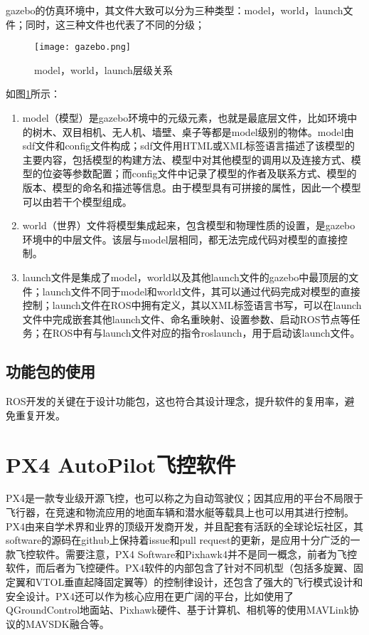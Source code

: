 gazebo的仿真环境中，其文件大致可以分为三种类型：model，world，launch文件；同时，这三种文件也代表了不同的分级；

\begin{figure}[!ht]
	\centering
	\texttt{[image: gazebo.png]}
	\caption{model，world，launch层级关系} 
	\label{fig3}
\end{figure}

如图\ref{fig3}所示：
\begin{enumerate}
	\item model（模型）是gazebo环境中的元级元素，也就是最底层文件，比如环境中的树木、双目相机、无人机、墙壁、桌子等都是model级别的物体。model由sdf文件和config文件构成；sdf文件用HTML或XML标签语言描述了该模型的主要内容，包括模型的构建方法、模型中对其他模型的调用以及连接方式、模型的位姿等参数配置；而config文件中记录了模型的作者及联系方式、模型的版本、模型的命名和描述等信息。由于模型具有可拼接的属性，因此一个模型可以由若干个模型组成。
	\item
	world（世界）文件将模型集成起来，包含模型和物理性质的设置，是gazebo环境中的中层文件。该层与model层相同，都无法完成代码对模型的直接控制。
	\item 
	launch文件是集成了model，world以及其他launch文件的gazebo中最顶层的文件；launch文件不同于model和world文件，其可以通过代码完成对模型的直接控制；launch文件在ROS中拥有定义，其以XML标签语言书写，可以在launch文件中完成嵌套其他launch文件、命名重映射、设置参数、启动ROS节点等任务；在ROS中有与launch文件对应的指令roslaunch，用于启动该launch文件。
\end{enumerate}


\subsection{功能包的使用}

ROS开发的关键在于设计功能包，这也符合其设计理念，提升软件的复用率，避免重复开发。


\section{PX4 AutoPilot飞控软件}
PX4是一款专业级开源飞控，也可以称之为自动驾驶仪；因其应用的平台不局限于飞行器，在竞速和物流应用的地面车辆和潜水艇等载具上也可以用其进行控制。PX4由来自学术界和业界的顶级开发商开发，并且配套有活跃的全球论坛社区，其software的源码在github上保持着issue和pull request的更新，是应用十分广泛的一款飞控软件。需要注意，PX4 Software和Pixhawk4并不是同一概念，前者为飞控软件，而后者为飞控硬件。PX4软件的内部包含了针对不同机型（包括多旋翼、固定翼和VTOL垂直起降固定翼等）的控制律设计，还包含了强大的飞行模式设计和安全设计。PX4还可以作为核心应用在更广阔的平台，比如使用了QGroundControl地面站、Pixhawk硬件、基于计算机、相机等的使用MAVLink协议的MAVSDK融合等\cite{meier2015px4}。

